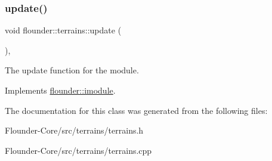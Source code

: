 \subsubsection{\texorpdfstring{update()}{update()}}
{\footnotesize\ttfamily void flounder\+::terrains\+::update (\begin{DoxyParamCaption}{ }\end{DoxyParamCaption})\hspace{0.3cm}{\ttfamily [override]}, {\ttfamily [virtual]}}



The update function for the module. 



Implements \hyperlink{classflounder_1_1imodule_a9a53d48a46b5f6b16a92b2cd8503f74a}{flounder\+::imodule}.



The documentation for this class was generated from the following files\+:\begin{DoxyCompactItemize}
\item 
Flounder-\/\+Core/src/terrains/terrains.\+h\item 
Flounder-\/\+Core/src/terrains/terrains.\+cpp\end{DoxyCompactItemize}
